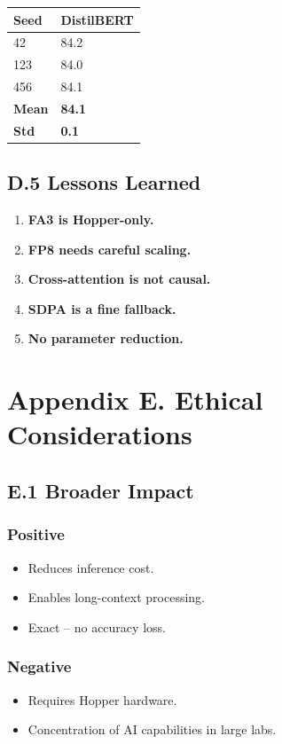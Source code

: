 \begin{table}[H]
\centering
\small
\begin{tabular}{ll}
\toprule
\textbf{Seed} & \textbf{DistilBERT} \\
\midrule
42 & 84.2 \\
123 & 84.0 \\
456 & 84.1 \\
\textbf{Mean} & \textbf{84.1} \\
\textbf{Std} & \textbf{0.1} \\
\bottomrule
\end{tabular}
\end{table}

\subsection{D.5 Lessons Learned}

\begin{enumerate}
\item \textbf{FA3 is Hopper-only.}
\item \textbf{FP8 needs careful scaling.}
\item \textbf{Cross-attention is not causal.}
\item \textbf{SDPA is a fine fallback.}
\item \textbf{No parameter reduction.}

\end{enumerate}


\section{Appendix E. Ethical Considerations}

\subsection{E.1 Broader Impact}

\subsubsection{Positive}
\begin{itemize}
\item Reduces inference cost.
\item Enables long-context processing.
\item Exact -- no accuracy loss.

\end{itemize}
\subsubsection{Negative}
\begin{itemize}
\item Requires Hopper hardware.
\item Concentration of AI capabilities in large labs.

\end{itemize}

